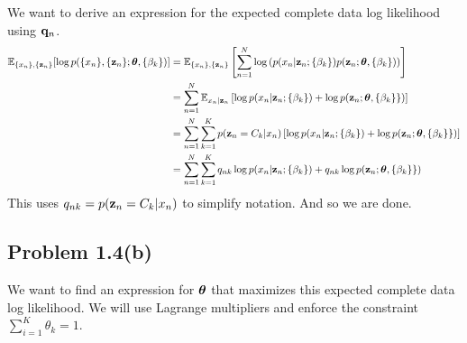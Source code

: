 \documentclass[submit]{harvardml}
\newcommand{\E}{\mathbb{E}}
\begin{document}
We want to derive an expression for the expected complete data log likelihood using $\vb{q}_n$.
\begin{align*}
    \E_{\{x_n\}, \{\vb{z}_n\}}[\log p(\{x_n\}, \{ \vb{z}_n \} ; \btheta, \{ \beta_k \})] &= \E_{\{x_n\}, \{\vb{z}_n\}}\left[\sum_{n=1}^N \log\left(p(x_n | \vb{z}_n; \{ \beta_k \}) p(\vb{z}_n ; \btheta, \{\beta_k\})\right)\right]\\
    &= \sum_{n=1}^N \E_{x_n | \vb{z}_n}\left[ \log p(x_n | \vb{z}_n ; \{\beta_k\}) + \log p(\vb{z}_n ; \btheta, \{\beta_k \} \}) \right] \\
    &= \sum_{n=1}^N \sum_{k=1}^K p(\vb{z}_n = C_k | x_n) \left[\log p(x_n | \vb{z}_n ; \{\beta_k\}) + \log p(\vb{z}_n ; \btheta, \{\beta_k \} \})\right] \\
    &= \sum_{n=1}^N \sum_{k=1}^K q_{n k} \log p(x_n | \vb{z}_n ; \{\beta_k\}) + q_{n k} \log p(\vb{z}_n ; \btheta, \{\beta_k \} \})
\end{align*}
This uses $q_{n k} = p(\vb{z}_n = C_k | x_n)$ to simplify notation. And so we are done.

\subsection*{Problem 1.4(b)}
We want to find an expression for $\boldsymbol{\theta}$ that maximizes this expected complete data log likelihood. We will use Lagrange multipliers and enforce the constraint $\sum_{i=1}^K \theta_k = 1$.
\end{document}
